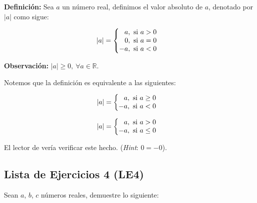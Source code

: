 \documentclass[11pt]{article}
\newcommand{\R}{\mathbb{R}}
\begin{document}
\textbf{Definición:} Sea $a$ un número real, definimos el valor absoluto de $a$, denotado por $|a|$ como sigue:

    \[
        |a| = \left\{
    \begin{array}{@{}r@{\thinspace}l}
        a, &  \ \text{si}  \ a>0\\
        0, &  \ \text{si}  \ a=0\\
        -a, & \  \text{si} \  a<0
    \end{array} \right. \]

\textbf{Observación:} $|a|\geq 0, \ \forall a\in \R$.

Notemos que la definición es equivalente a las siguientes:

\begin{center}
\begin{minipage}[c]{.3\linewidth}
    \[|a| = \left\{
        \begin{array}{@{}r@{\thinspace}l}
            a, & \ \text{si} \ a\geq 0\\
            -a, & \ \text{si} \ a<0
        \end{array} \right.\]
    \end{minipage}%
\begin{minipage}[c]{.3\linewidth}
    \[|a| = \left\{
        \begin{array}{@{}r@{\thinspace}l}
            a, & \ \text{si} \ a>0\\
            -a, & \ \text{si} \ a\leq 0
        \end{array} \right.\]
\end{minipage}
\end{center}

El lector de vería verificar este hecho. (\textit{Hint}: $0=-0$).

\subsection*{Lista de Ejercicios 4 (LE4)}

Sean $a$, $b$, $c$ números reales, demuestre lo siguiente:
\end{document}
